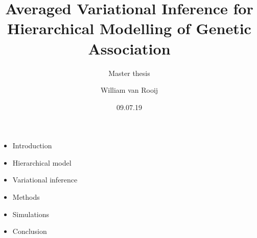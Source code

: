 \documentclass{beamer}
\begin{document}
\SetEndCharOfAlgoLine{}

\title{Averaged Variational Inference for Hierarchical Modelling of Genetic Association}
\subtitle{Master thesis}
\author{William van Rooij}
\date{09.07.19}
\maketitle
\begin{frame}
\begin{itemize}
\item Introduction
\item Hierarchical model
\item Variational inference
\item Methods
\item Simulations
\item Conclusion
\end{itemize}
\end{frame}
\end{document}
